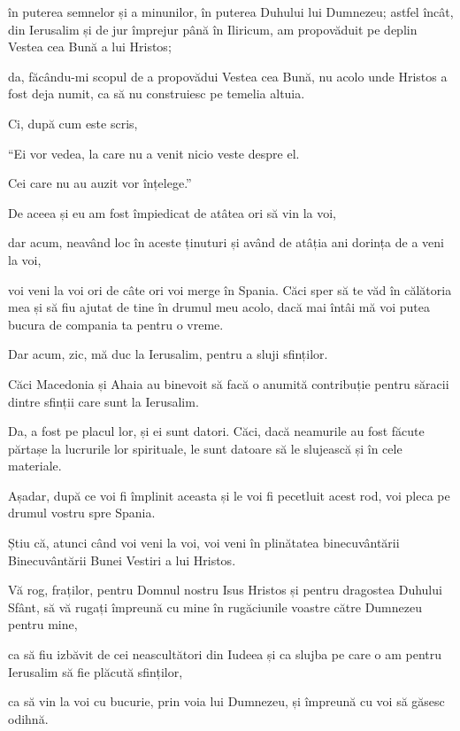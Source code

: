 {în puterea semnelor și a minunilor, în puterea Duhului lui Dumnezeu; astfel încât, din Ierusalim și de jur împrejur până în Iliricum, am propovăduit pe deplin Vestea cea Bună a lui Hristos;

da, făcându-mi scopul de a propovădui Vestea cea Bună, nu acolo unde Hristos a fost deja numit, ca să nu construiesc pe temelia altuia.

Ci, după cum este scris,

\par }{\Q “Ei vor vedea, la care nu a venit nicio veste despre el.

\par }{\QB Cei care nu au auzit vor înțelege.”


\par }{\PP {}De aceea și eu am fost împiedicat de atâtea ori să vin la voi,

dar acum, neavând loc în aceste ținuturi și având de atâția ani dorința de a veni la voi,

voi veni la voi ori de câte ori voi merge în Spania. Căci sper să te văd în călătoria mea și să fiu ajutat de tine în drumul meu acolo, dacă mai întâi mă voi putea bucura de compania ta pentru o vreme.

Dar acum, zic, mă duc la Ierusalim, pentru a sluji sfinților.

Căci Macedonia și Ahaia au binevoit să facă o anumită contribuție pentru săracii dintre sfinții care sunt la Ierusalim.

Da, a fost pe placul lor, și ei sunt datori. Căci, dacă neamurile au fost făcute părtașe la lucrurile lor spirituale, le sunt datoare să le slujească și în cele materiale.

Așadar, după ce voi fi împlinit aceasta și le voi fi pecetluit acest rod, voi pleca pe drumul vostru spre Spania.

Știu că, atunci când voi veni la voi, voi veni în plinătatea binecuvântării Binecuvântării Bunei Vestiri a lui Hristos.


\par }{\PP {}Vă rog, fraților, pentru Domnul nostru Isus Hristos și pentru dragostea Duhului Sfânt, să vă rugați împreună cu mine în rugăciunile voastre către Dumnezeu pentru mine,

ca să fiu izbăvit de cei neascultători din Iudeea și ca slujba pe care o am pentru Ierusalim să fie plăcută sfinților,

ca să vin la voi cu bucurie, prin voia lui Dumnezeu, și împreună cu voi să găsesc odihnă.

}
